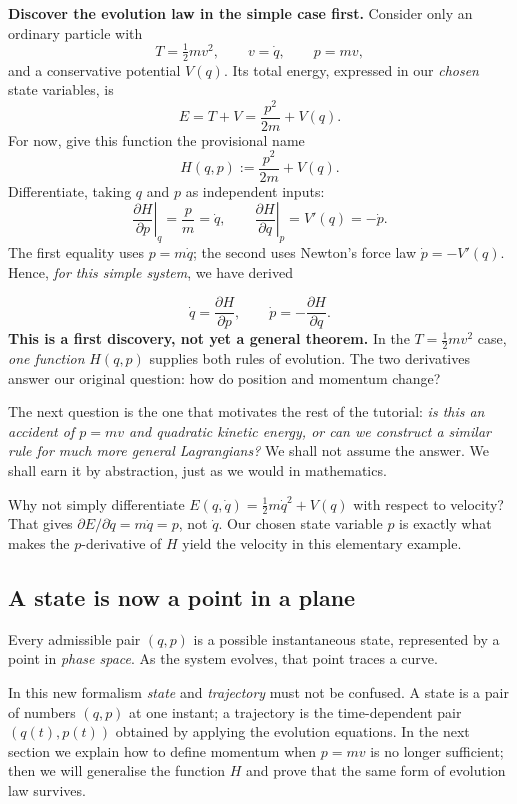 \documentclass[11pt,a4paper,oneside]{article}
\newcommand{\pd}[2]{\frac{\partial #1}{\partial #2}}
\begin{document}
\textbf{Discover the evolution law in the simple case first.} Consider only an ordinary particle with
\[
 T=\tfrac12m v^2,\qquad v=\dot q,\qquad p=mv,
\]
and a conservative potential $V(q)$. Its total energy, expressed in our \emph{chosen} state variables, is
\[
 E=T+V=\frac{p^2}{2m}+V(q).
\]
For now, give this function the provisional name
\[
 H(q,p):=\frac{p^2}{2m}+V(q).
\]
Differentiate, taking $q$ and $p$ as independent inputs:
\[
 \left.\pd{H}{p}\right|_q=\frac{p}{m}=\dot q,
 \qquad
 \left.\pd{H}{q}\right|_p=V'(q)=-\dot p.
\]
The first equality uses $p=m\dot q$; the second uses Newton's force law $\dot p=-V'(q)$. Hence, \emph{for this simple system}, we have derived
\begin{keybox}
\begin{equation}\label{eq:preview}
 \boxed{\dot q=\pd{H}{p},\qquad
 \dot p=-\pd{H}{q}.}
\end{equation}
\textbf{This is a first discovery, not yet a general theorem.} In the $T=\tfrac12m v^2$ case, \emph{one function} $H(q,p)$ supplies both rules of evolution. The two derivatives answer our original question: how do position and momentum change?
\end{keybox}
The next question is the one that motivates the rest of the tutorial: \emph{is this an accident of $p=mv$ and quadratic kinetic energy, or can we construct a similar rule for much more general Lagrangians?} We shall not assume the answer. We shall earn it by abstraction, just as we would in mathematics.

\begin{pausebox}
Why not simply differentiate $E(q,\dot q)=\tfrac12m\dot q^2+V(q)$ with respect to velocity? That gives $\partial E/\partial\dot q=m\dot q=p$, not $\dot q$. Our chosen state variable $p$ is exactly what makes the $p$-derivative of $H$ yield the velocity in this elementary example.
\end{pausebox}

\subsection{A state is now a point in a plane}
Every admissible pair $(q,p)$ is a possible instantaneous state, represented by a point in \emph{phase space}. As the system evolves, that point traces a curve.

In this new formalism \emph{state} and \emph{trajectory} must not be confused. A state is a pair of numbers $(q,p)$ at one instant; a trajectory is the time-dependent pair $(q(t),p(t))$ obtained by applying the evolution equations. In the next section we explain how to define momentum when $p=mv$ is no longer sufficient; then we will generalise the function $H$ and prove that the same form of evolution law survives.
\end{document}
